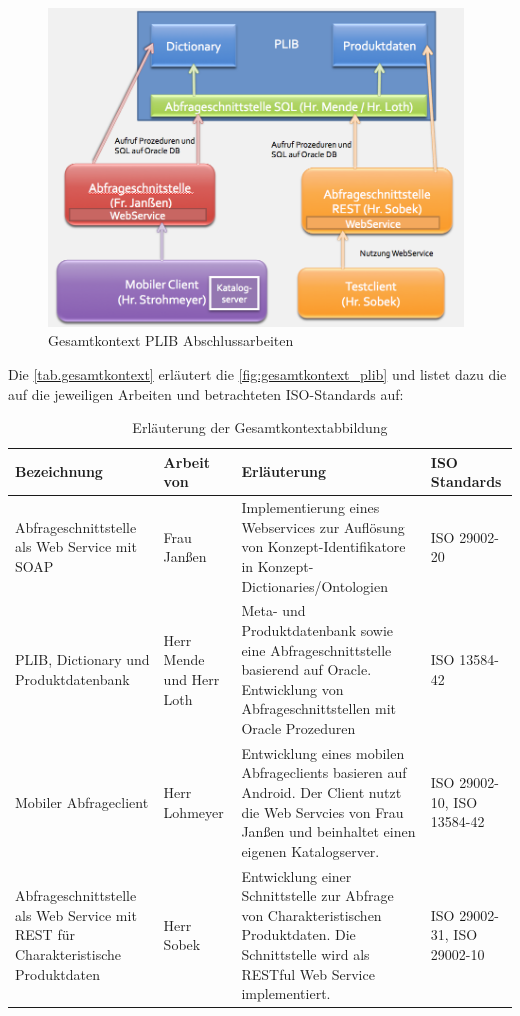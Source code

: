 \begin{figure}[htbp]
	\centering
		\includegraphics[width=0.98\textwidth]{images/gesamtkontext_plib.png}
	\caption{Gesamtkontext PLIB Abschlussarbeiten}
	\label{fig:gesamtkontext_plib}
\end{figure}

Die \autoref{tab.gesamtkontext} erläutert die \autoref{fig:gesamtkontext_plib} und listet dazu die auf die jeweiligen Arbeiten und betrachteten ISO-Standards auf: 

\begin{table}[!hbt]\vspace{1ex}\centering
\scriptsize
\begin{tabular}{p{3.15cm}p{2.8cm}p{5.5cm}p{3cm}}
\toprule \rowcolor{mylightergray}
\textbf{Bezeichnung} & \textbf{Arbeit von} & \textbf{Erläuterung} &  \textbf{ISO Standards}\\
\midrule
Abfrageschnittstelle als Web Service mit SOAP &  Frau Janßen & Implementierung eines Webservices zur Auflösung von Konzept-Identifikatore in Konzept-Dictionaries/Ontologien & ISO 29002-20 \\
\hline
PLIB, Dictionary und Produktdatenbank &  Herr Mende und Herr Loth & Meta- und Produktdatenbank  sowie eine Abfrageschnittstelle basierend auf Oracle. Entwicklung von Abfrageschnittstellen mit Oracle Prozeduren & ISO 13584-42 \citep[Vergl.][]{iso13584-42}  \\
\hline
Mobiler Abfrageclient & Herr Lohmeyer & Entwicklung eines mobilen Abfrageclients basieren auf Android. Der Client nutzt die Web Servcies von Frau Janßen und beinhaltet einen eigenen Katalogserver. & ISO 29002-10, ISO 13584-42 \\
\hline
Abfrageschnittstelle als Web Service mit REST für Charakteristische Produktdaten & Herr Sobek & Entwicklung einer Schnittstelle zur Abfrage von Charakteristischen Produktdaten. Die Schnittstelle wird als RESTful Web Service implementiert. & ISO 29002-31, ISO 29002-10 \\
\bottomrule
\end{tabular}
\caption{\label{tab.gesamtkontext}Erläuterung der Gesamtkontextabbildung}
\vspace{2ex}\end{table}

